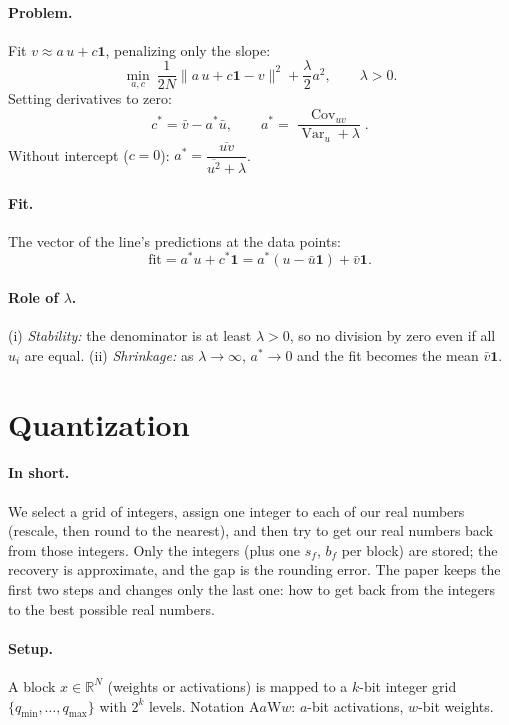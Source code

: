 \documentclass[11pt]{article}
\newcommand{\R}{\mathbb{R}}
\begin{document}
\paragraph{Problem.} Fit $v\approx a\,u+c\mathbf 1$, penalizing only the slope:
\[
\min_{a,c}\ \frac{1}{2N}\|a\,u+c\mathbf 1-v\|^2+\frac{\lambda}{2}a^2,\qquad \lambda>0 .
\]
Setting derivatives to zero:
\[
c^*=\bar v-a^*\bar u,\qquad a^*=\frac{\operatorname{Cov}_{uv}}{\operatorname{Var}_u+\lambda}.
\]
Without intercept ($c=0$): $a^*=\dfrac{\overline{uv}}{\overline{u^2}+\lambda}$.

\paragraph{Fit.} The vector of the line's predictions at the data points:
\[
\text{fit}=a^*u+c^*\mathbf 1=a^*(u-\bar u\mathbf 1)+\bar v\mathbf 1 .
\]

\paragraph{Role of $\lambda$.} (i) \emph{Stability:} the denominator is at least $\lambda>0$, so no division by zero even if all $u_i$ are equal. (ii) \emph{Shrinkage:} as $\lambda\to\infty$, $a^*\to0$ and the fit becomes the mean $\bar v\mathbf 1$.

\section{Quantization}

\paragraph{In short.} We select a grid of integers, assign one integer to each of our real numbers (rescale, then round to the nearest), and then try to get our real numbers back from those integers. Only the integers (plus one $s_f$, $b_f$ per block) are stored; the recovery is approximate, and the gap is the rounding error. The paper keeps the first two steps and changes only the last one: how to get back from the integers to the best possible real numbers.

\paragraph{Setup.} A block $x\in\R^N$ (weights or activations) is mapped to a $k$-bit integer grid $\{q_{\min},\dots,q_{\max}\}$ with $2^k$ levels. Notation A$a$W$w$: $a$-bit activations, $w$-bit weights.
\end{document}
